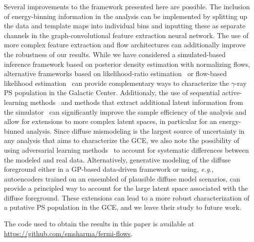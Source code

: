 \documentclass[prd,aps,10pt,nofootinbib,twocolumn,superscriptaddress,preprintnumbers,balancelastpage,longbibliography]{revtex4-1}
\begin{document}
Several improvements to the framework presented here are possible. The inclusion of energy-binning information in the analysis can be implemented by splitting up the data and template maps into individual bins and inputting these as separate channels in the graph-convolutional feature extraction neural network. The use of more complex feature extraction and flow architectures can additionally improve the robustness of our results. While we have considered a simulated-based inference framework based on posterior density estimation with normalizing flows, alternative frameworks based on likelihood-ratio estimation~\cite{Brehmer:2018eca,Brehmer:2018hga,Brehmer:2018kdj,Cranmer:2015bka, Hermans:2019ioj,Miller:2020hua,Miller:2021hys} or flow-based likelihood estimation~\cite{winkler2019learning,papamakarios2019sequential} can provide complementary ways to characterize the $\gamma$-ray PS population in the Galactic Center. Additionaly, the use of sequential active-learning methods~\cite{papamakarios2019sequential} and methods that extract additional latent information from the simulator~\cite{Brehmer:2018eca,Brehmer:2018hga,Brehmer:2018kdj,Brehmer:2019xox,Stoye:2018ovl} can significantly improve the sample efficiency of the analysis and allow for extensions to more complex latent spaces, in particular for an energy-binned analysis. 
Since diffuse mismodeling is the largest source of uncertainty in any analysis that aims to characterize the GCE, we also note the possibility of using adversarial learning methods~\cite{Louppe:2016ylz} to account for systematic differences between the modeled and real \Fermi data. Alternatively, generative modeling of the diffuse foreground either in a GP-based data-driven framework or using, \emph{e.g.}, autoencoders trained on an ensembled of plausible diffuse model scenarios, can provide a principled way to account for the large latent space associated with the diffuse foreground. 
These extensions can lead to a more robust characterization of a putative PS population in the GCE, and we leave their study to future work.

The code used to obtain the results in this paper is available at \url{https://github.com/smsharma/fermi-flows}.


\vspace{.3cm}
\end{document}
